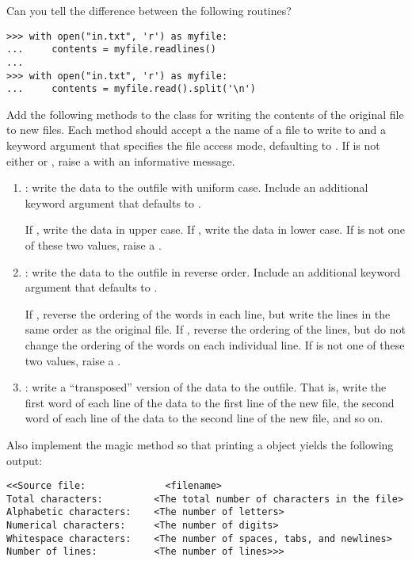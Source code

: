 Can you tell the difference between the following routines?

\begin{lstlisting}
>>> with open("in.txt", 'r') as myfile:
...     contents = myfile.readlines()
...
>>> with open("in.txt", 'r') as myfile:
...     contents = myfile.read().split('\n')
\end{lstlisting}

\begin{problem} %
Add the following methods to the  class for writing the contents of the original file to new files.
Each method should accept a the name of a file to write to and a keyword argument  that specifies the file access mode, defaulting to .
If  is not either  or , raise a  with an informative message.

\begin{enumerate}
\item {}: write the data to the outfile with uniform case. Include an additional keyword argument  that defaults to .

If , write the data in upper case.
If , write the data in lower case.
If  is not one of these two values, raise a .

\item {}: write the data to the outfile in reverse order. Include an additional keyword argument  that defaults to .

If , reverse the ordering of the words in each line, but write the lines in the same order as the original file.
If , reverse the ordering of the lines, but do not change the ordering of the words on each individual line.
If  is not one of these two values, raise a .

\item {}: write a ``transposed'' version of the data to the outfile.
That is, write the first word of each line of the data to the first line of the new file, the second word of each line of the data to the second line of the new file, and so on.
\end{enumerate}

Also implement the  magic method so that printing a  object yields the following output:
\begin{lstlisting}
<<Source file:              <filename>
Total characters:         <The total number of characters in the file>
Alphabetic characters:    <The number of letters>
Numerical characters:     <The number of digits>
Whitespace characters:    <The number of spaces, tabs, and newlines>
Number of lines:          <The number of lines>>>
\end{lstlisting}


\end{problem}
